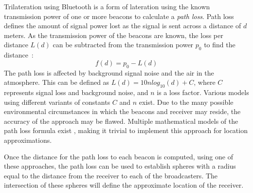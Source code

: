 Trilateration using Bluetooth is a form of lateration using the known transmission power of one or more beacons to calculate a \textit{path loss}.
Path loss defines the amount of signal power lost as the signal is sent across a distance of $d$ meters.
As the transmission power of the beacons are known, the loss per distance $L(d)$ can be subtracted from the transmission power $p_0$ to find the distance~\cite{taking_localization_to_the_wild}:
\begin{equation}\label{distance_equation}
    f(d) = p_0 - L(d)
\end{equation}
The path loss is affected by background signal noise and the air in the atmosphere.
This can be defined as $L(d) = 10n log_{10}(d)+C$, where $C$ represents signal loss and background noise, and $n$ is a loss factor. \cite{taking_localization_to_the_wild}
Various models using different variants of constants $C$ and $n$ exist\cite{path_loss_models}.
Due to the many possible environmental circumstances in which the beacons and receiver may reside, the accuracy of the approach may be flawed\cite{presence_ble_review}. 
Multiple mathematical models of the path loss formula exist \cite{rssi_indoor_pos,positioning_alg_rssi, RSSI_ZigBee_distance}, making it trivial to implement this approach for location approximations.	  
  
Once the distance for the path loss to each beacon is computed, using one of these approaches, the path loss can be used to establish spheres with a radius equal to the distance from the receiver to each of the broadcasters. 	 
The intersection of these spheres will define the approximate location of the receiver. 